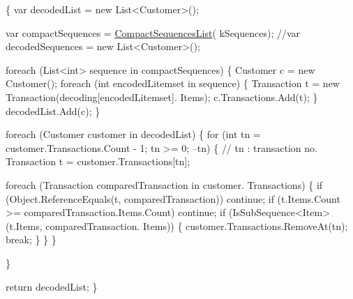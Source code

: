 \begin{DoxyCode}
                                                                               
      \{
            var decodedList = \textcolor{keyword}{new} List<Customer>();

            var compactSequences = \hyperlink{class_apriori_all_lib_1_1_apriori_all_algorithm_a2d56f7cbefc50b34a910c7623ee2496f}{CompactSequencesList}(
      kSequences);
            \textcolor{comment}{//var decodedSequences = new List<Customer>();}

            \textcolor{keywordflow}{foreach} (List<int> sequence \textcolor{keywordflow}{in} compactSequences) \{
                Customer c = \textcolor{keyword}{new} Customer();
                \textcolor{keywordflow}{foreach} (\textcolor{keywordtype}{int} encodedLitemset \textcolor{keywordflow}{in} sequence) \{
                    Transaction t = \textcolor{keyword}{new} Transaction(decoding[encodedLitemset].
      Items);
                    c.Transactions.Add(t);
                \}
                decodedList.Add(c);
            \}

            \textcolor{keywordflow}{foreach} (Customer customer \textcolor{keywordflow}{in} decodedList) \{
                \textcolor{keywordflow}{for} (\textcolor{keywordtype}{int} tn = customer.Transactions.Count - 1; tn >= 0; --tn) \{
                    \textcolor{comment}{// tn : transaction no.}
                    Transaction t = customer.Transactions[tn];

                    \textcolor{keywordflow}{foreach} (Transaction comparedTransaction \textcolor{keywordflow}{in} customer.
      Transactions) \{
                        \textcolor{keywordflow}{if} (Object.ReferenceEquals(t, comparedTransaction))
                            \textcolor{keywordflow}{continue};
                        \textcolor{keywordflow}{if} (t.Items.Count >= comparedTransaction.Items.Count)
                            \textcolor{keywordflow}{continue};
                        \textcolor{keywordflow}{if} (IsSubSequence<Item>(t.Items, comparedTransaction.
      Items)) \{
                            customer.Transactions.RemoveAt(tn);
                            \textcolor{keywordflow}{break};
                        \}
                    \}
                \}

            \}

            \textcolor{keywordflow}{return} decodedList;
        \}
\end{DoxyCode}


